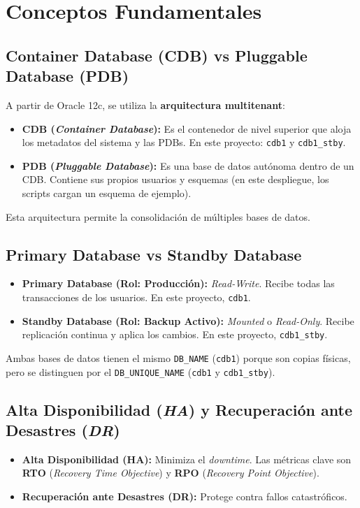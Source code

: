 \documentclass[11pt, a4paper]{report}
\begin{document}
\section{Conceptos Fundamentales}

\subsection{Container Database (CDB) vs Pluggable Database (PDB)}

A partir de Oracle 12c, se utiliza la \textbf{arquitectura multitenant}:
\begin{itemize}
    \item \textbf{CDB (\textit{Container Database}):} Es el contenedor de nivel superior que aloja los metadatos del sistema y las PDBs. En este proyecto: \texttt{cdb1} y \texttt{cdb1\_stby}.
    \item \textbf{PDB (\textit{Pluggable Database}):} Es una base de datos autónoma dentro de un CDB. Contiene sus propios usuarios y esquemas (en este despliegue, los scripts cargan un esquema de ejemplo).
\end{itemize}
Esta arquitectura permite la consolidación de múltiples bases de datos.

\subsection{Primary Database vs Standby Database}

\begin{itemize}
    \item \textbf{Primary Database (Rol: Producción):} \textit{Read-Write}.
Recibe todas las transacciones de los usuarios. En este proyecto, \texttt{cdb1}.
    \item \textbf{Standby Database (Rol: Backup Activo):} \textit{Mounted} o \textit{Read-Only}.
Recibe replicación continua y aplica los cambios. En este proyecto, \texttt{cdb1\_stby}.
\end{itemize}

Ambas bases de datos tienen el mismo \texttt{DB\_NAME} (\texttt{cdb1}) porque son copias físicas, pero se distinguen por el \texttt{DB\_UNIQUE\_NAME} (\texttt{cdb1} y \texttt{cdb1\_stby}).
\subsection{Alta Disponibilidad (\textit{HA}) y Recuperación ante Desastres (\textit{DR})}

\begin{itemize}
    \item \textbf{Alta Disponibilidad (HA):} Minimiza el \textit{downtime}.
Las métricas clave son \textbf{RTO} (\textit{Recovery Time Objective}) y \textbf{RPO} (\textit{Recovery Point Objective}).
\item \textbf{Recuperación ante Desastres (DR):} Protege contra fallos catastróficos.
\end{itemize}
\end{document}
